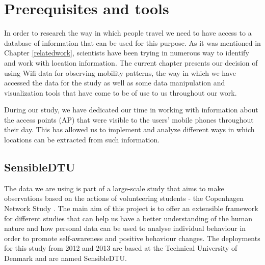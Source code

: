 \chapter{Prerequisites and tools}
In order to research the way in which people travel we need to have access to a
database of information that can be used for this purpose. As it was mentioned
in Chapter \ref{relatedwork}, scientists have been trying in numerous way to
identify and work with location information. The current chapter presents our
decision of using Wifi data for observing mobility patterns, the way in which we
have accessed the data for the study as well as some data manipulation and
visualization tools that have come to be of use to us throughout our work.

During our study, we have dedicated our time in working with information about
the access points (AP) that were visible to the users' mobile phones throughout
their day. This has allowed us to implement and analyze different ways in which
locations can be extracted from such information.

\section{SensibleDTU}
\label{sensible_dtu}

The data we are using is part of a large-scale study that aims to make
observations based on the actions of volunteering students - the Copenhagen
Network Study \cite{Stopczynski14m}. The main aim of this project is to offer an
extensible framework for different studies that can help us have a better
understanding of the human nature and how personal data can be used to analyse
individual behaviour in order to promote self-awareness and positive behaviour
changes. The deployments for this study from 2012 and 2013 are based at the
Technical University of Denmark and are named SensibleDTU.

